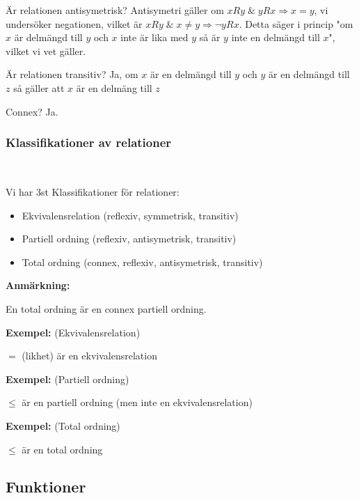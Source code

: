 \par\bigskip
\noindent Är relationen antisymetrisk? Antisymetri gäller om $xRy\;\&\;yRx\Rightarrow x=y$, vi undersöker negationen, vilket är $xRy\;\&\; x\neq y\Rightarrow\neg yRx$. Detta säger i princip "om $x$ är delmängd till $y$ och $x$ inte är lika med $y$ så är $y$ inte en delmängd till $x$", vilket vi vet gäller.
\par\bigskip
\noindent Är relationen transitiv? Ja, om $x$ är en delmängd till $y$ och $y$ är en delmängd till $z$ så gäller att $x$ är en delmäng till $z$
\par\bigskip
\noindent Connex? Ja.
\par\bigskip
\subsubsection{Klassifikationer av relationer}\hfill\\\par
\noindent Vi har 3st Klassifikationer för relationer:\par
\begin{itemize}
  \item Ekvivalensrelation (reflexiv, symmetrisk, transitiv)
  \item Partiell ordning (reflexiv, antisymetrisk, transitiv)
  \item Total ordning (connex, reflexiv, antisymetrisk, transitiv)
\end{itemize}
\par\bigskip
\noindent\textbf{Anmärkning:}\par
\noindent En total ordning är en connex partiell ordning.
\par\bigskip
\noindent\textbf{Exempel:} (Ekvivalensrelation)\par
\noindent $=$ (likhet) är en ekvivalensrelation
\par\bigskip
\noindent\textbf{Exempel:} (Partiell ordning)\par
\noindent $\leq$  är en partiell ordning (men inte en ekvivalensrelation)
\par\bigskip
\noindent\textbf{Exempel:} (Total ordning)\par
\noindent $\leq$ är en total ordning 
\par\bigskip
\subsection{Funktioner}\hfill\\\par
